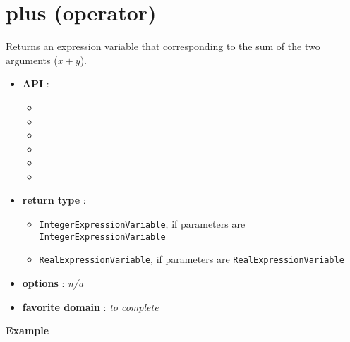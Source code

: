 \label{plus}
\hypertarget{plus}{}



\section{plus (operator)}\label{plus:plusoperator}\hypertarget{plus:plusoperator}{}
Returns an expression variable that corresponding to the sum of the two arguments (\(x+y\)).

\begin{itemize}
	\item \textbf{API} :
	\begin{itemize}
		\item {}
		\item {}
		\item {}
		\item {}
		\item {}
		\item {}
	\end{itemize}
	\item \textbf{return type} :
	\begin{itemize}
		\item \texttt{IntegerExpressionVariable}, if parameters are \texttt{IntegerExpressionVariable}
		\item \texttt{RealExpressionVariable}, if parameters are \texttt{RealExpressionVariable}
	\end{itemize}
	\item \textbf{options} : \emph{n/a}
	\item \textbf{favorite domain} : \emph{to complete}
\end{itemize}

\textbf{Example}





